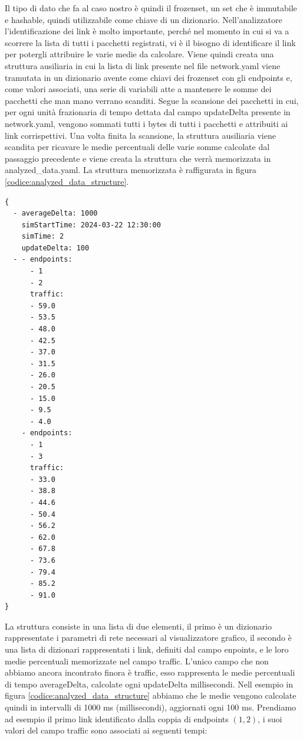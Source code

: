\documentclass[binding=0.6cm]{sapthesis}
\begin{document}
Il tipo di dato che fa al caso nostro è quindi il frozenset, un set che è immutabile e hashable, quindi utilizzabile come chiave di un dizionario.
Nell'analizzatore l'identificazione dei link è molto importante, perché nel momento in cui si va a scorrere la lista di tutti i pacchetti registrati,
vi è il bisogno di identificare il link per potergli attribuire le varie medie da calcolare. Viene quindi creata una struttura ausiliaria in cui
la lista di link presente nel file network.yaml viene tramutata in un dizionario avente come chiavi dei frozenset con gli endpoints e, come valori associati,
una serie di variabili atte a mantenere le somme dei pacchetti che man mano verrano scanditi.
Segue la scansione dei pacchetti in cui, per ogni unità frazionaria di tempo dettata dal campo updateDelta presente in network.yaml, vengono sommati tutti i bytes di tutti i pacchetti
e attribuiti ai link corrispettivi.
Una volta finita la scansione, la struttura ausiliaria viene scandita per ricavare le medie percentuali delle varie somme calcolate dal passaggio precedente e viene
creata la struttura che verrà memorizzata in analyzed\_data.yaml. La struttura memorizzata è raffigurata in figura \ref{codice:analyzed_data_structure}.

{\scriptsize %
\begin{lstlisting}[caption={Rappresentazione della struttura analyzed\_data}, label={codice:analyzed_data_structure}]
{
  - averageDelta: 1000
    simStartTime: 2024-03-22 12:30:00
    simTime: 2
    updateDelta: 100
  - - endpoints:
      - 1
      - 2
      traffic:
      - 59.0
      - 53.5
      - 48.0
      - 42.5
      - 37.0
      - 31.5
      - 26.0
      - 20.5
      - 15.0
      - 9.5
      - 4.0
    - endpoints:
      - 1
      - 3
      traffic:
      - 33.0
      - 38.8
      - 44.6
      - 50.4
      - 56.2
      - 62.0
      - 67.8
      - 73.6
      - 79.4
      - 85.2
      - 91.0
}
\end{lstlisting}
}

La struttura consiste in una lista di due elementi, il primo è un dizionario rappresentate 
i parametri di rete necessari al visualizzatore grafico, il
secondo è una lista di dizionari rappresentati i link, definiti dal campo enpoints, e le loro medie percentuali memorizzate nel campo traffic.
L'unico campo che non abbiamo ancora incontrato finora è traffic, esso rappresenta le medie percentuali di tempo averageDelta, calcolate ogni updateDelta millisecondi.
Nell esempio in figura \ref{codice:analyzed_data_structure} abbiamo che le medie vengono calcolate quindi in intervalli di 1000 ms (millisecondi), aggiornati ogni
100 ms. Prendiamo ad esempio il primo link identificato dalla coppia di endpoints \((1, 2)\), i suoi valori del campo traffic sono associati ai seguenti tempi:
\newline
\end{document}
